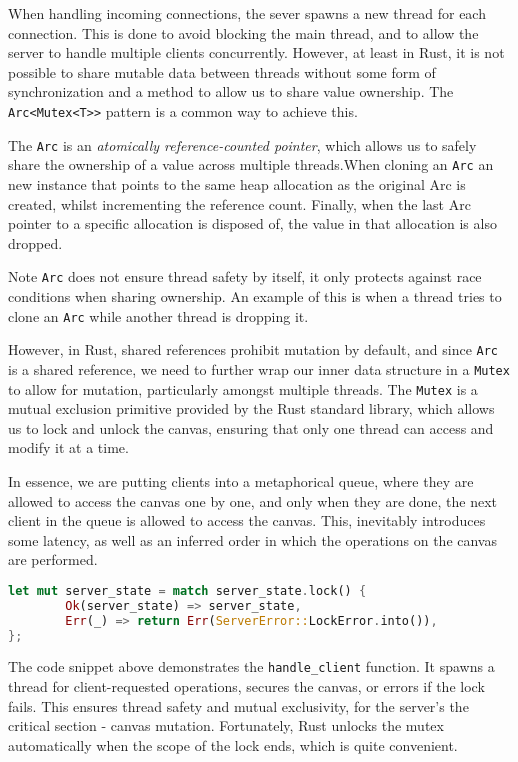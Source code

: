 \documentclass{article}
\newcommand{\code}[1]{\texttt{#1}}
\begin{document}
When handling incoming connections, the sever spawns a new thread for each
connection. This is done to avoid blocking the main thread, and to allow the
server to handle multiple clients concurrently. However, at least in Rust, it is
not possible to share mutable data between threads without some form of
synchronization and a method to allow us to share value ownership.  The
\code{Arc<Mutex<T>>} pattern is a common way to achieve this.

The \code{Arc} is an \textit{atomically reference-counted pointer}, which allows
us to safely share the ownership of a value across multiple threads.When cloning
an \code{Arc} an new instance that points to the same heap allocation as the
original Arc is created, whilst incrementing the reference count. Finally, when the last
Arc pointer to a specific allocation is disposed of, the value in that
allocation is also dropped.

\begin{mainbox}{Note}
    \code{Arc} does not ensure thread safety by itself, it only protects against
    race conditions when sharing ownership. An example of this is when a thread
    tries to clone an \code{Arc} while another thread is dropping it.
\end{mainbox}

However, in Rust, shared references prohibit mutation by default, and since
\code{Arc} is a shared reference, we need to further wrap our inner data
structure in a \code{Mutex} to allow for mutation, particularly amongst multiple
threads. The \code{Mutex} is a mutual exclusion primitive provided by the Rust
standard library, which allows us to lock and unlock the canvas, ensuring that
only one thread can access and modify it at a time.

In essence, we are putting clients into a metaphorical queue, where they are
allowed to access the canvas one by one, and only when they are done, the next
client in the queue is allowed to access the canvas. This, inevitably introduces
some latency, as well as an inferred order in which the operations on the canvas
are performed.

\begin{subbox}{}
    \lstset{xleftmargin=0\textwidth, xrightmargin=0\textwidth}
    \begin{lstlisting}[language=Rust]
let mut server_state = match server_state.lock() {
        Ok(server_state) => server_state,
        Err(_) => return Err(ServerError::LockError.into()),
};
    \end{lstlisting}
\end{subbox}

The code snippet above demonstrates the \code{handle\_client} function. It spawns a
thread for client-requested operations, secures the canvas, or errors if the
lock fails.  This ensures thread safety and mutual exclusivity, for the server's
the critical section - canvas mutation. Fortunately, Rust unlocks the mutex
automatically when the scope of the lock ends, which is quite convenient.

\newpage
\end{document}
